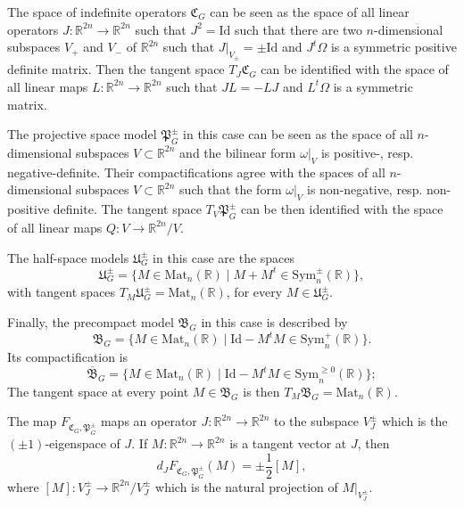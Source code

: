 \documentclass[oneside,11pt]{amsart}
\theoremstyle{definition}
\theoremstyle{remark}
\numberwithin{thm}{section}
\numberwithin{equation}{section}
\begin{document}
    The space of indefinite operators $\mathfrak{C}_G$ can be seen as the space of all linear operators $J\colon \mathbb R^{2n}\to\mathbb R^{2n}$ such that $J^2=\mathrm{Id}$ such that there are two $n$-dimensional subspaces $V_+$ and $V_-$ of $\mathbb R^{2n}$ such that $J|_{V_\pm}=\pm\mathrm{Id}$ and $J^t\Omega$ is a symmetric positive definite matrix. Then the tangent space $T_J\mathfrak{C}_G$ can be identified with the space of all linear maps $L\colon \mathbb R^{2n}\to\mathbb R^{2n}$ such that $JL=-LJ$ and $L^t\Omega$ is a symmetric matrix.

    The projective space model $\mathfrak{P}_G^\pm$ in this case can be seen as the space of all $n$-dimensional subspaces $V\subset \mathbb R^{2n}$ and the bilinear form $\omega|_V$ is positive-, resp. negative-definite. Their compactifications agree with the spaces of all $n$-dimensional subspaces $V\subset\mathbb R^{2n}$ such that the form $\omega|_V$ is non-negative, resp. non-positive definite.  The tangent space $T_V\mathfrak{P}_G^\pm$ can be then identified with the space of all linear maps $Q\colon V\to \mathbb{R}^{2n}/V$. 

    The half-space models $\mathfrak U_G^\pm$ in this case are the spaces 
    $$\mathfrak U_G^\pm=\{M\in\mathrm{Mat}_n(\mathbb R)\mid M+M^t \in\mathrm{Sym}^\pm_n(\mathbb R)\},$$
    with tangent spaces $T_M\mathfrak U_G^\pm=\mathrm{Mat}_n(\mathbb R)$, for every $M\in\mathfrak U_G^\pm$.

    Finally, the precompact model $\mathfrak{B}_G$ in this case is described by
    $$\mathfrak{B}_G=\{M\in\mathrm{Mat}_n(\mathbb R)\mid \mathrm{Id}-M^tM \in\mathrm{Sym}^+_n(\mathbb R)\}.$$
    Its compactification is
    $$\overline{\mathfrak{B}}_G=\{M\in\mathrm{Mat}_n(\mathbb R)\mid \mathrm{Id}-M^tM \in\mathrm{Sym}^{\geq 0}_n(\mathbb R)\};$$
    The tangent space at every point $M\in\mathfrak B_G$ is then $T_M\mathfrak B_G=\mathrm{Mat}_n(\mathbb R)$.
    
    The map $F_{\mathfrak{C}_G,\mathfrak{P}_G^\pm}$ maps an operator $J\colon \mathbb R^{2n}\to \mathbb R^{2n}$ to the subspace $V_J^\pm$ which is the $(\pm 1)$-eigenspace of $J$. If $M\colon \mathbb R^{2n}\to \mathbb R^{2n}$ is a tangent vector at $J$, then 
    \[d_JF_{\mathfrak{C}_G,\mathfrak{P}_G^\pm}(M)=\pm\frac{1}{2}[M],\] 
    where $[M]\colon V_J^\pm\to \mathbb R^{2n}/V_J^\pm$ which is the natural projection of $M|_{V_J^\pm}$.
\end{document}
